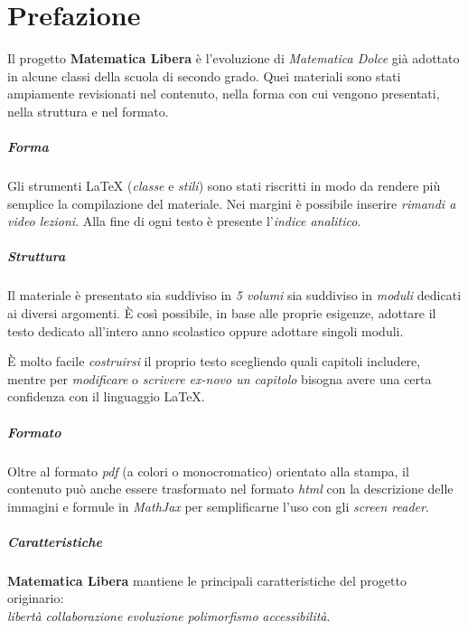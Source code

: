 \chapter{Prefazione}

Il progetto \textbf{Matematica Libera} è l'evoluzione di 
\emph{Matematica Dolce} già adottato in alcune classi della scuola di 
secondo grado. 
Quei materiali sono stati ampiamente revisionati nel contenuto, 
nella forma con cui vengono presentati, nella struttura e nel formato.

\paragraph {Forma} 

Gli strumenti {\LaTeX} (\emph{classe} e \emph{stili}) sono stati riscritti 
in modo da rendere più semplice la compilazione del materiale. 
Nei margini è possibile inserire \emph{rimandi a video lezioni}. 
Alla fine di ogni testo è presente l'\emph{indice analitico}.

\paragraph {Struttura} 
Il materiale è presentato sia suddiviso in \emph{5 volumi} sia suddiviso 
in \emph{moduli} dedicati ai diversi argomenti.
È così possibile, in base alle proprie esigenze, 
adottare il testo dedicato all'intero anno scolastico oppure adottare 
singoli moduli.

È molto facile \emph{costruirsi} il proprio testo scegliendo quali 
capitoli includere, mentre per \emph{modificare} o 
\emph{scrivere ex-novo un capitolo} 
bisogna avere una certa confidenza con il linguaggio \LaTeX.

\paragraph {Formato} 
Oltre al formato \emph{pdf} (a colori o monocromatico) orientato alla 
stampa, il contenuto può anche essere trasformato nel formato \emph{html} 
con la descrizione delle immagini e formule in \emph{MathJax} per 
semplificarne l'uso con gli \emph{screen reader}.

\paragraph {Caratteristiche} 
\textbf{Matematica Libera} mantiene le principali caratteristiche del 
progetto originario:\\[.5em]
{\Large \centering 
\emph{libertà} \quad \emph{collaborazione} \quad \emph{evoluzione} \quad 
\emph{polimorfismo} \quad \emph{accessibilità}.
}

